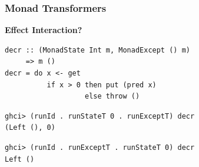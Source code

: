 \documentclass[xcolor=pdftex,dvipsnames,table]{beamer}
\begin{document}
{
\begin{frame}[fragile, t]
  \frametitle{Monad Transformers}
  \begin{center}
    \textbf{\Large{Effect Interaction?}}
  \end{center}
  \begin{verbatim}
decr :: (MonadState Int m, MonadExcept () m)
     => m ()
decr = do x <- get
          if x > 0 then put (pred x)
                   else throw ()
  \end{verbatim}
  \pause
  \begin{verbatim}
ghci> (runId . runStateT 0 . runExceptT) decr
(Left (), 0)
  \end{verbatim}
  \pause
  \begin{verbatim}
ghci> (runId . runExceptT . runStateT 0) decr
Left ()
  \end{verbatim}

  {
  \TPMargin{2mm}
  }
\end{frame}
}
\end{document}

